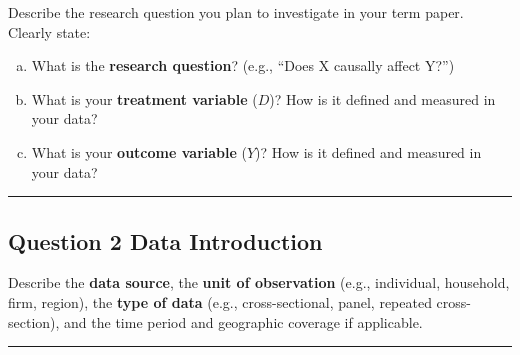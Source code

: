 \documentclass[paper=a4, fontsize=11pt]{scrartcl}
\newcommand{\horrule}[1]{\rule{\linewidth}{#1}}
\begin{document}
Describe the research question you plan to investigate in your term paper. Clearly state:
\begin{enumerate}[(a)]
  \item What is the \textbf{research question}? (e.g., ``Does X causally affect Y?'')
  \item What is your \textbf{treatment variable} ($D$)? How is it defined and measured in your data?
  \item What is your \textbf{outcome variable} ($Y$)? How is it defined and measured in your data?
\end{enumerate}

\bigskip\horrule{0.4pt}\bigskip


\subsection*{Question 2 \quad Data Introduction}

Describe the \textbf{data source}, the \textbf{unit of observation} (e.g., individual, household, firm, region), the \textbf{type of data} (e.g., cross-sectional, panel, repeated cross-section), and the time period and geographic coverage if applicable.


\bigskip\horrule{0.4pt}\bigskip

\end{document}
